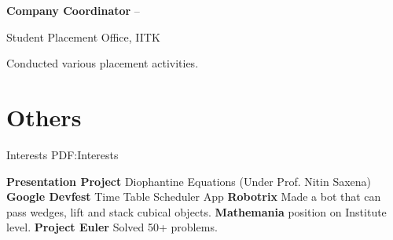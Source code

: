 \documentclass[letterpaper,10pt,oneside]{article}
\begin{document}
\begin{body}
{\textbf{Company Coordinator}}
\hfill
{} --

\GapNoBreak
\BulletItem
Student Placement Office, IITK
\begin{detail}
\SubBulletItem
Conducted various placement activities.
\end{detail}


\section
{Others}
{Interests}
{PDF:Interests}

\textbf{Presentation Project}
 Diophantine Equations (Under Prof. Nitin Saxena)\newline
\textbf{Google Devfest}
 Time Table Scheduler App\newline
\textbf{Robotrix}
 Made a bot that can pass wedges, lift and stack cubical objects.\newline
\textbf{Mathemania}
  position on Institute level.\newline
\textbf{Project Euler}
 Solved 50+ problems.





\end{body}
\end{document}

